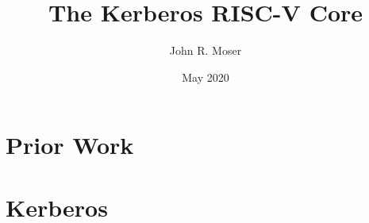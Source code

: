 \documentclass[a4paper,12pt]{book}
\begin{document}
\author{John R. Moser}
\title{The Kerberos RISC-V Core}
\date{May 2020}

\frontmatter
\maketitle

\cleardoublepage
\tableofcontents

\mainmatter
\part{Prior Work}





\part{Kerberos}





\backmatter
\end{document}
